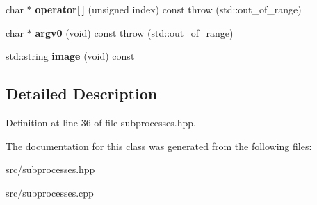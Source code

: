 \begin{DoxyCompactItemize}
\item 
char $\ast$ {\bfseries operator\mbox{[}$\,$\mbox{]}} (unsigned index) const   throw (std\+::out\+\_\+of\+\_\+range)\hypertarget{classstlplus_1_1arg__vector_aceac79f63197c756d7ac8355d54fb140}{}\label{classstlplus_1_1arg__vector_aceac79f63197c756d7ac8355d54fb140}

\item 
char $\ast$ {\bfseries argv0} (void) const   throw (std\+::out\+\_\+of\+\_\+range)\hypertarget{classstlplus_1_1arg__vector_ac390ec7b7f6417863285c1af85bce017}{}\label{classstlplus_1_1arg__vector_ac390ec7b7f6417863285c1af85bce017}

\item 
std\+::string {\bfseries image} (void) const \hypertarget{classstlplus_1_1arg__vector_abe0788eb76a42f582698c633981cbc94}{}\label{classstlplus_1_1arg__vector_abe0788eb76a42f582698c633981cbc94}

\end{DoxyCompactItemize}


\subsection{Detailed Description}


Definition at line 36 of file subprocesses.\+hpp.



The documentation for this class was generated from the following files\+:\begin{DoxyCompactItemize}
\item 
src/subprocesses.\+hpp\item 
src/subprocesses.\+cpp\end{DoxyCompactItemize}
